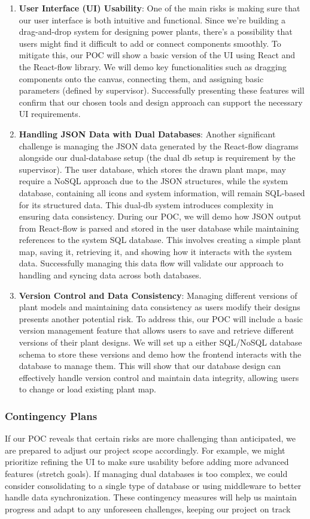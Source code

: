 \documentclass{article}
\begin{document}
\begin{enumerate}
    \item \textbf{User Interface (UI) Usability}: One of the main risks is making sure that our user interface is both intuitive and functional. Since we’re building a drag-and-drop system for designing power plants, there’s a possibility that users might find it difficult to add or connect components smoothly. To mitigate this, our POC will show a basic version of the UI using React and the React-flow library. We will demo key functionalities such as dragging components onto the canvas, connecting them, and assigning basic parameters (defined by supervisor). Successfully presenting these features will confirm that our chosen tools and design approach can support the necessary UI requirements.
    \item \textbf{Handling JSON Data with Dual Databases}: Another significant challenge is managing the JSON data generated by the React-flow diagrams alongside our dual-database setup (the dual db setup is requirement by the supervisor). The user database, which stores the drawn plant maps, may require a NoSQL approach due to the JSON structures, while the system database, containing all icons and system information, will remain SQL-based for its structured data. This dual-db system introduces complexity in ensuring data consistency. During our POC, we will demo how JSON output from React-flow is parsed and stored in the user database while maintaining references to the system SQL database. This involves creating a simple plant map, saving it, retrieving it, and showing how it interacts with the system data. Successfully managing this data flow will validate our approach to handling and syncing data across both databases.
    \item \textbf{Version Control and Data Consistency}: Managing different versions of plant models and maintaining data consistency as users modify their designs presents another potential risk. To address this, our POC will include a basic version management feature that allows users to save and retrieve different versions of their plant designs. We will set up a either SQL/NoSQL database schema to store these versions and demo how the frontend interacts with the database to manage them. This will show that our database design can effectively handle version control and maintain data integrity, allowing users to change or load existing plant map.
\end{enumerate}

\subsubsection{Contingency Plans}
If our POC reveals that certain risks are more challenging than anticipated, we are prepared to adjust our project scope accordingly. For example, we might prioritize refining the UI to make sure usability before adding more advanced features (stretch goals). If managing dual databases is too complex, we could consider consolidating to a single type of database or using middleware to better handle data synchronization. These contingency measures will help us maintain progress and adapt to any unforeseen challenges, keeping our project on track
\end{document}
